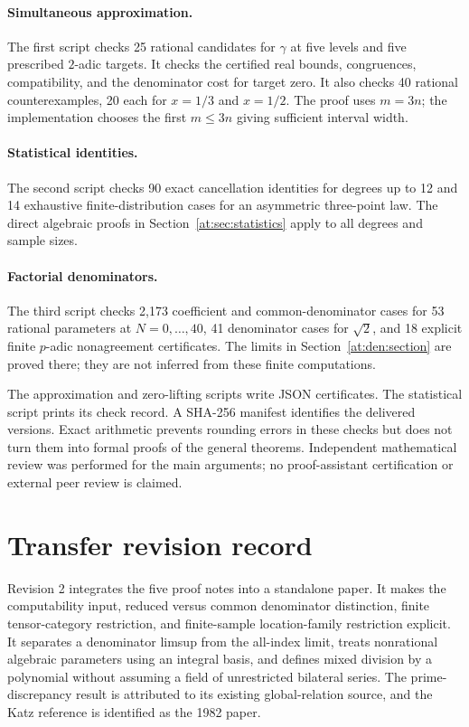 \documentclass[11pt,a4paper]{article}
\theoremstyle{definition}
\theoremstyle{remark}
\numberwithin{equation}{section}
\begin{document}
\paragraph{Simultaneous approximation.}
The first script checks 25 rational candidates for $\gamma$ at five
levels and five prescribed $2$-adic targets. It checks the certified
real bounds, congruences, compatibility, and the denominator cost for
target zero. It also checks 40 rational counterexamples, 20 each for
$x=1/3$ and $x=1/2$. The proof uses $m=3n$; the implementation chooses
the first $m\le3n$ giving sufficient interval width.
\paragraph{Statistical identities.}
The second script checks 90 exact cancellation identities for degrees
up to 12 and 14 exhaustive finite-distribution cases for an asymmetric
three-point law. The direct algebraic proofs in
Section~\ref{at:sec:statistics} apply to all degrees and sample sizes.
\paragraph{Factorial denominators.}
The third script checks 2,173 coefficient and common-denominator cases
for 53 rational parameters at $N=0,\ldots,40$, 41 denominator cases
for $\sqrt2$, and 18 explicit finite $p$-adic nonagreement certificates.
The limits in Section~\ref{at:den:section} are proved there; they are not
inferred from these finite computations.

The approximation and zero-lifting scripts write JSON certificates.
The statistical script prints its check record. A SHA-256 manifest
identifies the delivered versions. Exact arithmetic prevents rounding
errors in these checks but does not turn them into formal proofs of
the general theorems. Independent mathematical review was performed
for the main arguments; no proof-assistant certification or external
peer review is claimed.

\section{Transfer revision record}
\label{at:app:revision}

Revision 2 integrates the five proof notes into a standalone paper. It
makes the computability input, reduced versus common denominator
distinction, finite tensor-category restriction, and finite-sample
location-family restriction explicit. It separates a denominator
limsup from the all-index limit, treats nonrational algebraic parameters
using an integral basis, and defines mixed division by a polynomial
without assuming a field of unrestricted bilateral series. The
prime-discrepancy result is attributed to its existing global-relation
source, and the Katz reference is identified as the 1982 paper.
\end{document}
